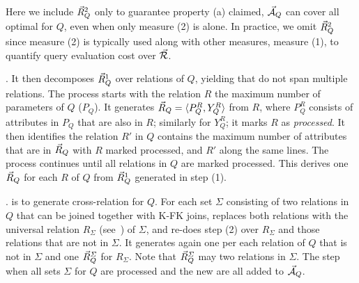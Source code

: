 \vspace{0.36ex}
Here we include $\vec{R}_{Q}^{2}$ only to guarantee property (a)
 claimed, \ie $\vec{{\mathcal A}}_{Q}$ can cover all optimal
\bdss for $Q$, even when only measure (2) is  alone. In
practice, we omit $\vec{R}_{Q}^{2}$ since measure (2) is typically
used along with other measures, \eg measure (1), to quantify
query evaluation cost over $\vec{{\mathcal R}}$.


\vspace{0.36ex}

. It then decomposes $\vec{R}_{Q}^{1}$ over relations of
$Q$, yielding \bss that do not span  multiple relations. The
process starts with the relation $R$  the maximum
number of parameters of $Q$ (\ie $P_{Q}$). It generates
$\vec{R}_{Q} = \langle P_{Q}^{R},\allowbreak Y_{Q}^{R}\rangle$ from $R$, where
$P_{Q}^{R}$ consists of attributes in $P_{Q}$ that are also in
$R$; similarly for $Y_{Q}^{R}$; it marks $R$ as {\em processed}.
It then identifies the relation $R'$ in $Q$  contains the maximum
number of attributes that are in \bss $\vec{R}_{Q}$ with $R$
marked processed, and  $R'$ along the same lines. The
process continues until all relations in $Q$ are marked
processed. This derives one \bs $\vec{R}_{Q}$ for each $R$ of $Q$
from $\vec{R}_{Q}^{1}$ generated in step (1).

\vspace{0.36ex}

.  is to generate cross-relation \bss
for $Q$. For each set $\Sigma$ consisting of two relations in $Q$
that can be joined together with K-FK joins, \usc replaces both
relations with the universal relation $R_{\Sigma}$
(see~\cite{AbHuVi1995}) of $\Sigma$, and re-does step (2) over
$R_{\Sigma}$ and those relations that are not in $\Sigma$. It
generates again one \bs per each relation of $Q$ that is not 
in $\Sigma$ and one \bs $\vec{R}_{Q}^{\Sigma}$ for $R_{\Sigma}$. Note
that $\vec{R}_{Q}^{\Sigma}$ may  two relations in $\Sigma$.
The step  %
when all sets $\Sigma$ for $Q$ are processed
and the new \bss are all added to $\vec{{\mathcal A}}_{Q}$. 



